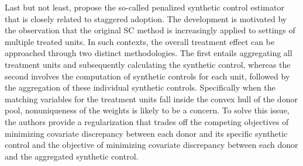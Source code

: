 Last but not least, \cite{abadie:2019} propose the so-called penalized synthetic control estimator that is closely related to staggered adoption. The development is motivated by the observation that the original \ac{SC} method is increasingly applied to settings of multiple treated units. In such contexts, the overall treatment effect can be approached through two distinct methodologies. The first entails aggregating all treatment units and subsequently calculating the synthetic control, whereas the second involves the computation of  synthetic controls for each unit, followed by the aggregation of these individual synthetic controls. Specifically when the matching variables for the treatment units fall inside the convex hull of the donor pool, nonuniqueness of the weights is likely to be a concern. To solve this issue, the authors provide a regularization that trades off the competing objectives of minimizing covariate discrepancy between each donor and its specific synthetic control and the objective of minimizing covariate discrepancy between each donor and the aggregated synthetic control.

